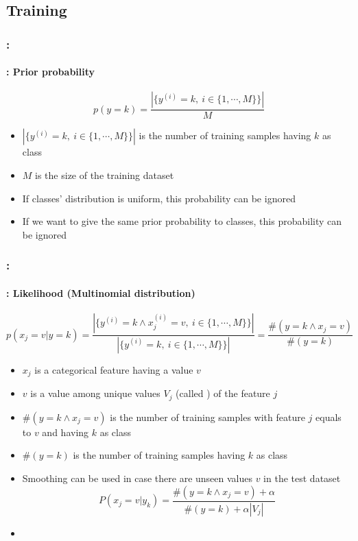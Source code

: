 \documentclass[xcolor=table]{beamer}
\begin{document}
\subsection{Training}

\begin{frame}
	\frametitle{\insertshortsubtitle: \insertsection}
	\framesubtitle{\insertsubsection: Prior probability}
	
	\[p(y=k) = \frac{|\{y^{(i)} = k,\ i \in \{1, \cdots, M\}\}|}{M}\]
	
	\begin{itemize}
		\item $|\{y^{(i)} = k,\ i \in \{1, \cdots, M\}\}|$ is the number of training samples having $k$ as class
		\item $M$ is the size of the training dataset
		\item If classes' distribution is uniform, this probability can be ignored 
		\item If we want to give the same prior probability to classes, this probability can be ignored
	\end{itemize}
	
\end{frame}


\begin{frame}
	\frametitle{\insertshortsubtitle: \insertsection}
	\framesubtitle{\insertsubsection: Likelihood (Multinomial distribution)}
	
	\[p(x_j = v|y=k) = \frac{|\{y^{(i)} = k \wedge x^{(i)}_j = v,\ i \in \{1, \cdots, M\}\}|}{|\{y^{(i)} = k,\ i \in \{1, \cdots, M\}\}|} = \frac{\#(y = k \wedge x_j = v)}{\#(y = k)}\]
	
	\begin{itemize}
		\item $x_j$ is a categorical feature having a value $ v $
		\item $v$ is a value among unique values $ V_j $ (called ) of the feature $j$
		\item $\#(y = k \wedge x_j = v)$ is the number of training samples with feature $j$ equals to $v$ and having $k$ as class
		\item $\#(y = k)$ is the number of training samples having $k$ as class
		\item Smoothing can be used in case there are unseen values $v$ in the test dataset
		\[P(x_j = v|y_k) = \frac{\#(y = k \wedge x_j = v) + \alpha}{\#(y = k) + \alpha |V_j|}\]
		\item {}
		
	\end{itemize}
	
	
\end{frame}
\end{document}
